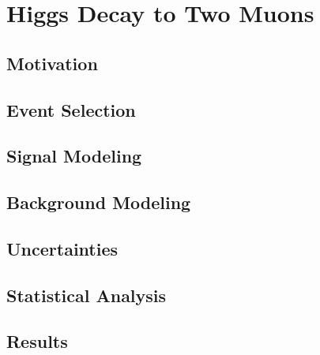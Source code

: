 \chapter{Higgs Decay to Two Muons}

\section{Motivation}
\section{Event Selection}
\section{Signal Modeling}
\section{Background Modeling}
\section{Uncertainties}
\section{Statistical Analysis}
\section{Results}

